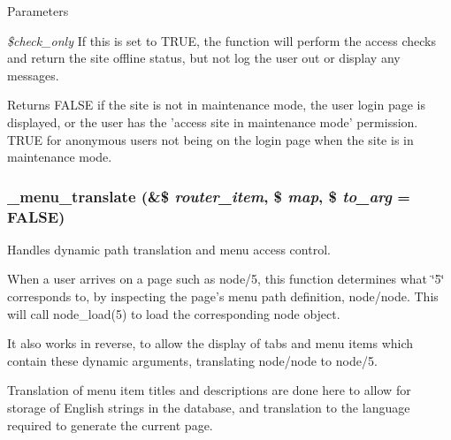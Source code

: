 \begin{DoxyParams}{Parameters}
\item[{\em \$check\_\-only}]If this is set to TRUE, the function will perform the access checks and return the site offline status, but not log the user out or display any messages.\end{DoxyParams}
\begin{DoxyReturn}{Returns}
FALSE if the site is not in maintenance mode, the user login page is displayed, or the user has the 'access site in maintenance mode' permission. TRUE for anonymous users not being on the login page when the site is in maintenance mode. 
\end{DoxyReturn}
\hypertarget{group__menu_ga0e8535f35bcd1a03e71120a2d6ecc099}{
\subsubsection[{\_\-menu\_\-translate}]{\setlength{\rightskip}{0pt plus 5cm}\_\-menu\_\-translate (\&\$ {\em router\_\-item}, \/  \$ {\em map}, \/  \$ {\em to\_\-arg} = {\ttfamily FALSE})}}
\label{group__menu_ga0e8535f35bcd1a03e71120a2d6ecc099}
Handles dynamic path translation and menu access control.

When a user arrives on a page such as node/5, this function determines what \char`\"{}5\char`\"{} corresponds to, by inspecting the page's menu path definition, node/node. This will call node\_\-load(5) to load the corresponding node object.

It also works in reverse, to allow the display of tabs and menu items which contain these dynamic arguments, translating node/node to node/5.

Translation of menu item titles and descriptions are done here to allow for storage of English strings in the database, and translation to the language required to generate the current page.


